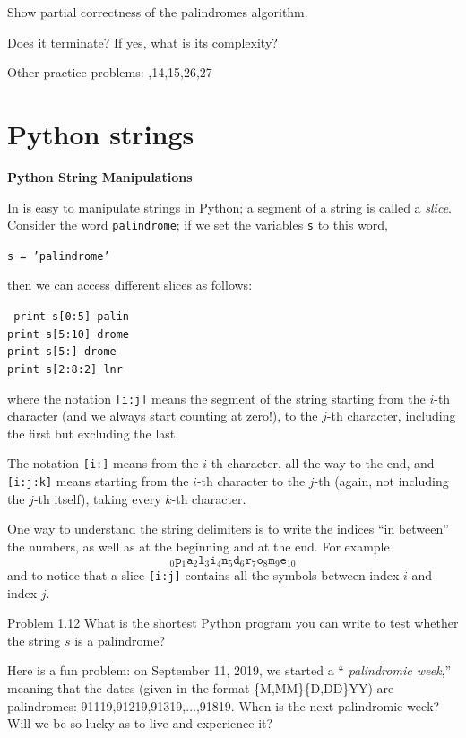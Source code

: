 \begin{frame}
Show partial correctness of the palindromes algorithm.

Does it terminate? If yes, what is its complexity?

Other practice problems: ,14,15,26,27\fi
\end{frame}

\section{Python strings}

\begin{frame}
{\bf Python String Manipulations}

In is easy to manipulate strings in Python; a segment of a string is
called a {\em slice}.  Consider the word
{\tt palindrome}; if we set the variables {\tt s} to this word,

{\tt s = 'palindrome'}

then we can access different slices as follows:

{\tt
print s[0:5]      palin \\
print s[5:10]     drome \\
print s[5:]       drome \\
print s[2:8:2]    lnr
}

where the notation {\tt [i:j]} means the segment of the string
starting from the $i$-th character (and we always start counting at
zero!), to the $j$-th character, including the first but excluding the
last.  
\end{frame}

\begin{frame}
The notation {\tt [i:]} means from the $i$-th character, all
the way to the end, and {\tt [i:j:k]} means starting from the $i$-th
character to the $j$-th (again, not including the $j$-th itself),
taking every $k$-th character.

One way to understand the string delimiters is to write the indices
``in between'' the numbers, as well as at the beginning and at the
end.  For example
$$
{}_{0}
\texttt{p}
{}_{1}
\texttt{a}
{}_{2}
\texttt{l}
{}_{3}
\texttt{i}
{}_{4}
\texttt{n}
{}_{5}
\texttt{d}
{}_{6}
\texttt{r}
{}_{7}
\texttt{o}
{}_{8}
\texttt{m}
{}_{9}
\texttt{e}
{}_{10}
$$
and to notice that a slice {\tt [i:j]} contains all the symbols
between index $i$ and index $j$.
\end{frame}

\begin{frame}
\ifthird Problem 1.12 \else \fi
What is the shortest Python program you can write to test whether the
string $s$ is a palindrome?

\vskip 2cm
Here is a fun problem: on September 11, 2019, we started a ``{\em
palindromic week},'' meaning that the dates (given in the format
\{M,MM\}\{D,DD\}YY) are palindromes: 91119,91219,91319,$\ldots$,91819.
When is the next palindromic week? Will we be so lucky as to live and
experience it?
\end{frame}

